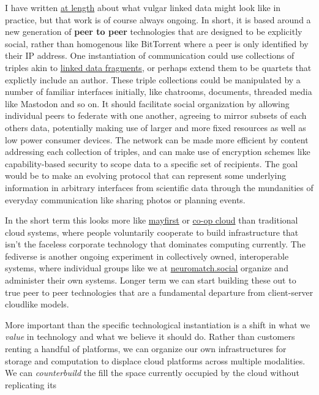 I have written \href{https://jon-e.net/infrastructure}{at length} about
what vulgar linked data might look like in practice, but that work is of
course always ongoing. In short, it is based around a new generation of
\textbf{peer to peer} technologies that are designed to be
explicitly social, rather than homogenous like BitTorrent where a peer
is only identified by their IP address. One instantiation of
communication could use collections of triples akin to
\href{https://linkeddatafragments.org/concept/}{linked data fragments},
or perhaps extend them to be quartets that explictly include an author.
These triple collections could be manipulated by a number of familiar
interfaces initially, like chatrooms, documents, threaded media like
Mastodon and so on. It should facilitate social organization by allowing
individual peers to federate with one another, agreeing to mirror
subsets of each others data, potentially making use of larger and more
fixed resources as well as low power consumer devices. The network can
be made more efficient by content addressing each collection of triples,
and can make use of encryption schemes like capability-based security to
scope data to a specific set of recipients. The goal would be to make an
evolving protocol that can represent some underlying information in
arbitrary interfaces from scientific data through the mundanities of
everyday communication like sharing photos or planning events.

In the short term this looks more like
\href{https://mayfirst.coop/en/}{mayfirst} or
\href{https://coopcloud.tech/}{co-op cloud} than traditional cloud
systems, where people voluntarily cooperate to build infrastructure that
isn't the faceless corporate technology that dominates computing
currently. The fediverse is another ongoing experiment in collectively
owned, interoperable systems, where individual groups like we at
\href{https://neuromatch.social}{neuromatch.social} organize and
administer their own systems. Longer term we can start building these
out to true peer to peer technologies that are a fundamental departure
from client-server cloudlike models.

More important than the specific technological instantiation is a shift
in what we \emph{value} in technology and what we believe it should do.
Rather than customers renting a handful of platforms, we can organize
our own infrastructures for storage and computation to displace cloud
platforms across multiple modalities. We can \emph{counterbuild} the
fill the space currently occupied by the cloud without replicating its


